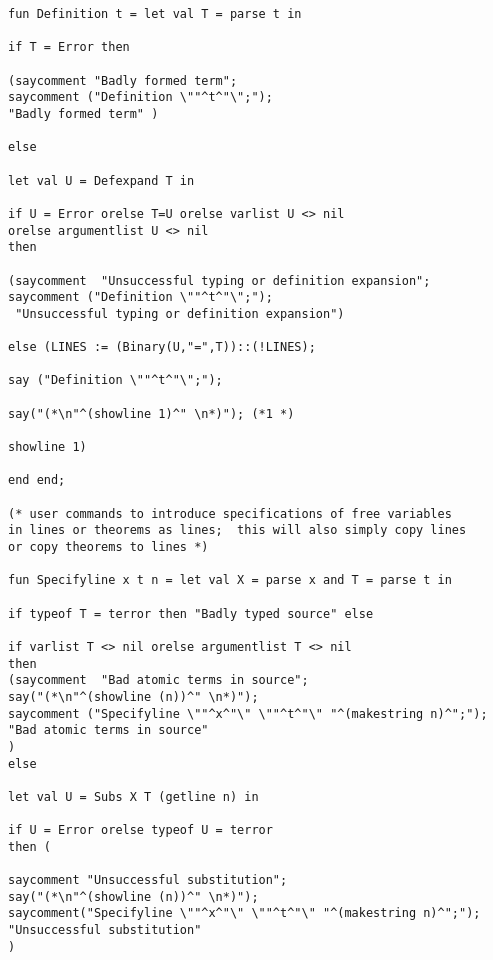 \documentclass{article}
\begin{document}
{{\begin {verbatim}
fun Definition t = let val T = parse t in

if T = Error then 

(saycomment "Badly formed term";
saycomment ("Definition \""^t^"\";");
"Badly formed term" )

else

let val U = Defexpand T in

if U = Error orelse T=U orelse varlist U <> nil 
orelse argumentlist U <> nil 
then

(saycomment  "Unsuccessful typing or definition expansion";
saycomment ("Definition \""^t^"\";");
 "Unsuccessful typing or definition expansion")

else (LINES := (Binary(U,"=",T))::(!LINES);

say ("Definition \""^t^"\";");

say("(*\n"^(showline 1)^" \n*)"); (*1 *)

showline 1)

end end;                                                                                                                                                                                                                                                                                                                                                                                                                                                                                                                                               

(* user commands to introduce specifications of free variables
in lines or theorems as lines;  this will also simply copy lines
or copy theorems to lines *)

fun Specifyline x t n = let val X = parse x and T = parse t in

if typeof T = terror then "Badly typed source" else

if varlist T <> nil orelse argumentlist T <> nil 
then
(saycomment  "Bad atomic terms in source";
say("(*\n"^(showline (n))^" \n*)"); 
saycomment ("Specifyline \""^x^"\" \""^t^"\" "^(makestring n)^";");
"Bad atomic terms in source" 
)
else

let val U = Subs X T (getline n) in 

if U = Error orelse typeof U = terror 
then (

saycomment "Unsuccessful substitution";
say("(*\n"^(showline (n))^" \n*)"); 
saycomment("Specifyline \""^x^"\" \""^t^"\" "^(makestring n)^";");
"Unsuccessful substitution"
)


\end{verbatim}}}
\end{document}
